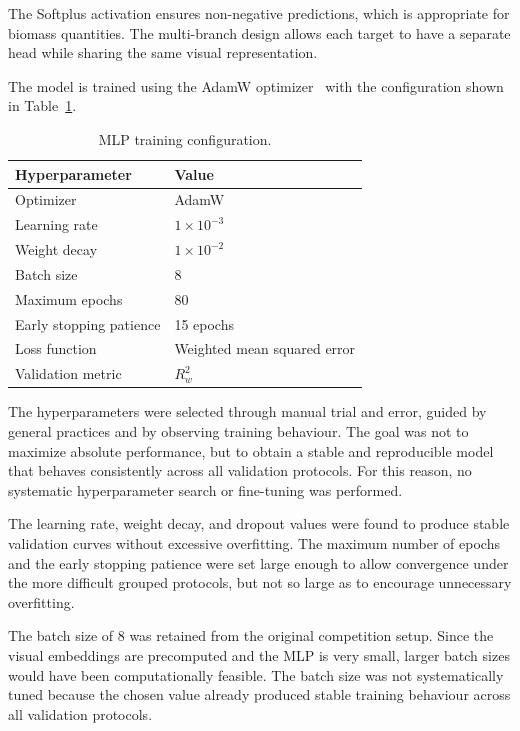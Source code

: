 The Softplus activation ensures non-negative predictions, which is appropriate for biomass quantities. The multi-branch design allows each target to have a separate head while sharing the same visual representation.

The model is trained using the AdamW optimizer~\cite{loshchilov2017decoupled} with the configuration shown in Table~\ref{tab:training_config}.

\begin{table}[htbp]
\centering
\caption{MLP training configuration.}
\label{tab:training_config}
\begin{tabular}{ll}
\hline
\textbf{Hyperparameter} & \textbf{Value} \\
\hline
Optimizer & AdamW \\
Learning rate & $1 \times 10^{-3}$ \\
Weight decay & $1 \times 10^{-2}$ \\
Batch size & 8 \\
Maximum epochs & 80 \\
Early stopping patience & 15 epochs \\
Loss function & Weighted mean squared error \\
Validation metric & $R^2_w$ \\
\hline
\end{tabular}
\end{table}

The hyperparameters were selected through manual trial and error, guided by general practices and by observing training behaviour. The goal was not to maximize absolute performance, but to obtain a stable and reproducible model that behaves consistently across all validation protocols. For this reason, no systematic hyperparameter search or fine-tuning was performed.

The learning rate, weight decay, and dropout values were found to produce stable validation curves without excessive overfitting. The maximum number of epochs and the early stopping patience were set large enough to allow convergence under the more difficult grouped protocols, but not so large as to encourage unnecessary overfitting.

The batch size of 8 was retained from the original competition setup. Since the visual embeddings are precomputed and the MLP is very small, larger batch sizes would have been computationally feasible. The batch size was not systematically tuned because the chosen value already produced stable training behaviour across all validation protocols.

